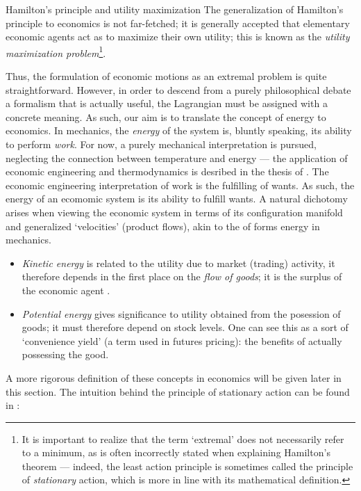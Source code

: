 \begin{econ}{Hamilton's principle and utility maximization}
    The generalization of Hamilton's principle to economics is not far-fetched; it is generally accepted that elementary economic agents act as to maximize their own utility; this is known as the \emph{utility maximization problem}\footnote{It is important to realize that the term `extremal' does not necessarily refer to a minimum, as is often incorrectly stated when explaining Hamilton's theorem --- indeed, the least action principle is sometimes called the principle of \emph{stationary} action, which is more in line with its mathematical definition.}. \\

    Thus, the formulation of economic motions as an extremal problem is quite straightforward. However, in order to descend from a purely philosophical debate a formalism that is actually useful, the Lagrangian must be assigned with a concrete meaning. As such, our aim is to translate the concept of energy to economics. In mechanics, the \emph{energy} of the system is, bluntly speaking, its ability to perform \emph{work}. For now, a purely mechanical interpretation is pursued, neglecting the connection between temperature and energy --- the application of economic engineering and thermodynamics is desribed in the thesis of \citet{Manders2019}. The economic engineering interpretation of work is the fulfilling of wants. As such, the energy of an ecomomic system is its ability to fulfill wants. A natural dichotomy arises when viewing the economic system in terms of its configuration manifold and generalized `velocities' (product flows), akin to the of forms energy in mechanics.
    \begin{itemize}
        \item \emph{Kinetic energy} is related to the utility due to market (trading) activity, it therefore depends in the first place on the \emph{flow of goods}; it is the surplus of the economic agent \cite{Mankiw2017}.
        \item \emph{Potential energy} gives significance to utility obtained from the posession of goods; it must therefore depend on stock levels. One can see this as a sort of `convenience yield' (a term used in futures pricing): the benefits of actually possessing the good.
    \end{itemize}
    A more rigorous definition of these concepts in economics will be given later in this section. The intuition behind the principle of stationary action can be found in \citet{Feynman2010}:

\end{econ}

